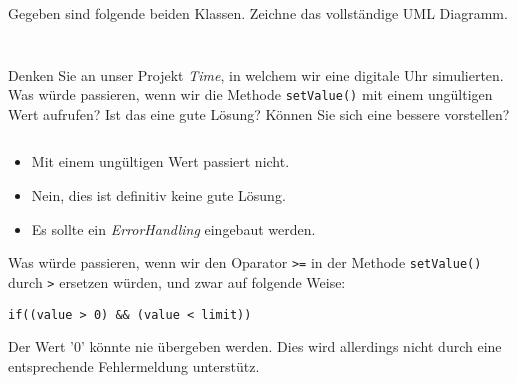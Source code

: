 \documentclass[12pt,a4paper]{exam}
\begin{document}
    \begin{questions}

        \question[10] Gegeben sind folgende beiden Klassen. Zeichne das vollständige
        UML Diagramm.

        \begin{minipage}{0.45\textwidth}
            \inputminted[autogobble,linenos,frame=single]{java}{../java/academy/One.java}
        \end{minipage}
        \begin{minipage}{0.49\textwidth}
            \inputminted[autogobble,frame=single]{java}{../java/academy/Two.java}
        \end{minipage}
        \makeemptybox{5cm}
        \addpoints

        \newpage
        \question[6] Denken Sie an unser Projekt \emph{Time}, in welchem wir eine digitale
        Uhr simulierten. Was würde passieren, wenn wir die Methode \texttt
        {setValue()} mit einem ungültigen Wert aufrufen? Ist das eine gute Lösung? Können
        Sie sich eine bessere vorstellen?

        \inputminted[autogobble,firstline=53,lastline=57]
        {java}{../java/time/NumberDisplay.java}
        \addpoints

        \ifprintanswers
        \begin{solution}
            \begin{itemize}
                \item Mit einem ungültigen Wert passiert nicht.
                \item Nein, dies ist definitiv keine gute Lösung.
                \item Es sollte ein \emph{ErrorHandling} eingebaut werden.
            \end{itemize}
        \end{solution}
        \else\makeemptybox{2in}
        \fi


        \question[4] Was würde passieren, wenn wir den Oparator \texttt{>=} in der Methode
        \texttt{setValue()} durch \texttt{>} ersetzen würden, und zwar auf folgende
        Weise:

        \texttt{if((value > 0) && (value < limit))}
        \addpoints

        \ifprintanswers
        \begin{solution}
            Der Wert '0' könnte nie übergeben werden. Dies wird allerdings nicht
            durch eine entsprechende Fehlermeldung unterstütz.
        \end{solution}
        \else\makeemptybox{2in}
        \fi



\end{questions}
\end{document}

